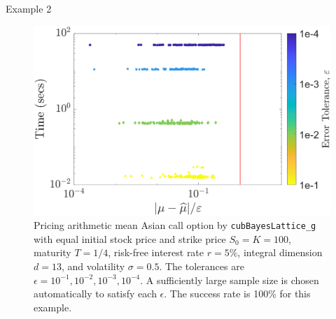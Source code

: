 \documentclass[final]{beamer}
\newlength{\onecolwid}
\newlength{\twocolwid}
\begin{document}
\begin{frame}[t]
\begin{columns}[t]
\begin{column}{\twocolwid}
\begin{column}{\twocolwid} %

\begin{columns}[t,totalwidth=\twocolwid] %

\begin{column}{\onecolwid} %


\begin{block}{\vspace{-11mm}Example 2}

\begin{figure}
	\centering
	\includegraphics[width=1.\linewidth]{"optPrice_guaranteed_time_full_Baker_d12_r1_2018-Sep-6b"}
	\caption[OptPrice guaranteed : FB]{Pricing  arithmetic mean Asian call option by \texttt{cubBayesLattice\_g}  with equal initial stock price and strike price $S_0 = K = 100$, maturity $T = 1/4$, risk-free interest rate $r =  5\%$, integral dimension $d = 13$, and volatility $\sigma = 0.5$. 
	The tolerances are $\epsilon=10^{-1}, 10^{-2}, 10^{-3}, 10^{-4}$. A sufficiently large sample size is chosen automatically to satisfy each $\epsilon$. The success rate is 100\% for this example.}
	\label{fig:optprice-guaranteed-FB}
\end{figure}

\end{block}



\end{column}
\end{columns}
\end{column}
\end{column}
\end{columns}
\end{frame}
\end{document}
